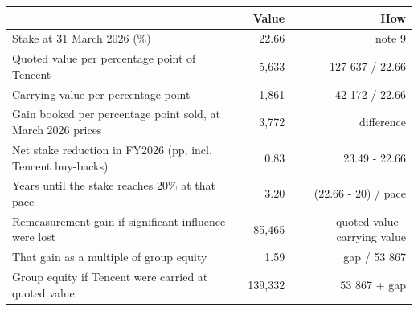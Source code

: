 \begin{tabular}{lrr}
\toprule
 & Value & How \\
\midrule
Stake at 31 March 2026 (\%) & 22.66 & note 9 \\
Quoted value per percentage point of Tencent & 5,633 & 127 637 / 22.66 \\
Carrying value per percentage point & 1,861 & 42 172 / 22.66 \\
Gain booked per percentage point sold, at March 2026 prices & 3,772 & difference \\
Net stake reduction in FY2026 (pp, incl. Tencent buy-backs) & 0.83 & 23.49 - 22.66 \\
Years until the stake reaches 20\% at that pace & 3.20 & (22.66 - 20) / pace \\
Remeasurement gain if significant influence were lost & 85,465 & quoted value - carrying value \\
That gain as a multiple of group equity & 1.59 & gap / 53 867 \\
Group equity if Tencent were carried at quoted value & 139,332 & 53 867 + gap \\
\bottomrule
\end{tabular}

